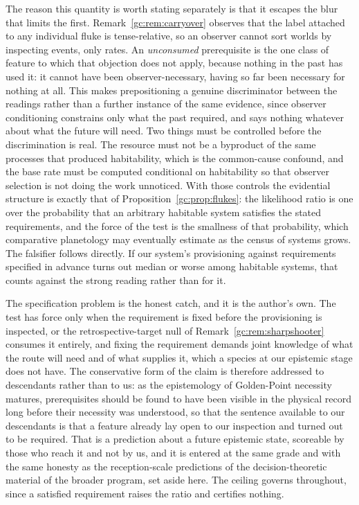 \begin{remark}
The reason this quantity is worth stating separately is that it
escapes the blur that limits the first. Remark~\ref{gc:rem:carryover}
observes that the label attached to any individual fluke is
tense-relative, so an observer cannot sort worlds by inspecting
events, only rates. An \emph{unconsumed} prerequisite is the one
class of feature to which that objection does not apply, because
nothing in the past has used it: it cannot have been
observer-necessary, having so far been necessary for nothing at all.
This makes prepositioning a genuine discriminator between the
readings rather than a further instance of the same evidence, since
observer conditioning constrains only what the past required, and
says nothing whatever about what the future will need. Two things
must be controlled before the discrimination is real. The resource
must not be a byproduct of the same processes that produced
habitability, which is the common-cause confound, and the base rate
must be computed conditional on habitability so that observer
selection is not doing the work unnoticed. With those controls the
evidential structure is exactly that of
Proposition~\ref{gc:prop:flukes}: the likelihood ratio is one over
the probability that an arbitrary habitable system satisfies the
stated requirements, and the force of the test is the smallness of
that probability, which comparative planetology may eventually
estimate as the census of systems grows. The falsifier follows
directly. If our system's provisioning against requirements
specified in advance turns out median or worse among habitable
systems, that counts against the strong reading rather than for it.

The specification problem is the honest catch, and it is the
author's own. The test has force only when the requirement is fixed
before the provisioning is inspected, or the retrospective-target
null of Remark~\ref{gc:rem:sharpshooter} consumes it entirely, and
fixing the requirement demands joint knowledge of what the route
will need and of what supplies it, which a species at our epistemic
stage does not have. The conservative form of the claim is therefore
addressed to descendants rather than to us: as the epistemology of
Golden-Point necessity matures, prerequisites should be found to
have been visible in the physical record long before their necessity
was understood, so that the sentence available to our descendants is
that a feature already lay open to our inspection and turned out to
be required. That is a prediction about a future epistemic state,
scoreable by those who reach it and not by us, and it is entered at
the same grade and with the same honesty as the reception-scale
predictions of the decision-theoretic material of the broader program, set aside here. The ceiling governs throughout, since
a satisfied requirement raises the ratio and certifies nothing.
\end{remark}

